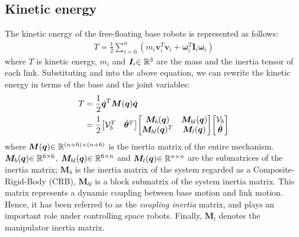 \subsection{Kinetic energy}
The kinetic energy of the free-floating base robots is represented as follows:
%
\begin{align}
  T = \frac{1}{2}\sum_{i = 0}^{n}(m_{i}\bm{v}_{i}^{T}\bm{v}_{i} + \bm{\omega}_{i}^{T}\bm{I}_{i}\bm{\omega}_{i})
  \label{eq:ENERGY_GEN}
\end{align}
%
where $T$ is kinetic energy,
$m_{i}$ and $\bm{I}_{i}{\in\mathbb{R}^{3}}$ are the mass and the inertia tensor of each link.
Substituting  and  into the above equation,
we can rewrite the kinetic energy in terms of the base and the joint variables:
%
\begin{align}
  T &= \frac{1}{2}\dot{\bm{q}}^{T}\bm{M}(\bm{q})\dot{\bm{q}}\\
  &= \frac{1}{2}{\begin{bmatrix} \mathcal{V}_{b}^{T} & {\dot{\bm{\theta}}}^{T} \end{bmatrix}}{\begin{bmatrix} \bm{M}_{b}(\bm{q}) & \bm{M}_{bl}(\bm{q}) \\
    \bm{M}_{bl}(\bm{q})^{T} & \bm{M}_{l}(\bm{q}) \end{bmatrix}}
  {\begin{bmatrix} \mathcal{V}_{b} \\ {\dot{\bm{\theta}}} \end{bmatrix}}\label{eq:ENERGY}
\end{align}
%
where $\bm{M}(\bm{q}){\in\mathbb{R}^{(n+6)\times (n+6)}}$ is the inertia matrix of the entire mechanism.
$\bm{M}_{b}(\bm{q}){\in\mathbb{R}^{6 \times 6}}$,
$\bm{M}_{bl}(\bm{q}){\in\mathbb{R}^{6 \times n}}$ and $\bm{M}_{l}(\bm{q}){\in\mathbb{R}^{n \times n}}$ are the submatrices of the inertia matrix;
$\bm{M}_{b}$ is the inertia matrix of the system regarded as a Composite-Rigid-Body (CRB),
$\bm{M}_{bl}$ is a block submatrix of the system inertia matrix.
This matrix represents a dynamic coupling between base motion and link motion.
Hence, it has been referred to as the \textit{coupling inertia} matrix,
and plays an important role under controlling space robots.
Finally, $\bm{M}_{l}$ denotes the manipulator inertia matrix.

